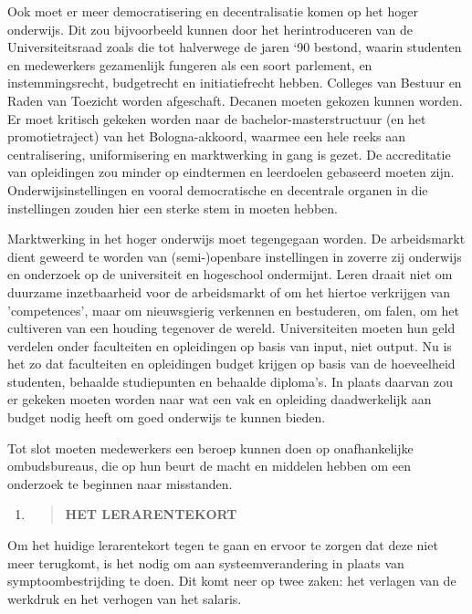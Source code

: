 Ook moet er meer democratisering en decentralisatie komen op het hoger
onderwijs. Dit zou bijvoorbeeld kunnen door het herintroduceren van de
Universiteitsraad zoals die tot halverwege de jaren `90 bestond, waarin
studenten en medewerkers gezamenlijk fungeren als een soort parlement,
en instemmingsrecht, budgetrecht en initiatiefrecht hebben. Colleges van
Bestuur en Raden van Toezicht worden afgeschaft. Decanen moeten gekozen
kunnen worden. Er moet kritisch gekeken worden naar de
bachelor-masterstructuur (en het promotietraject) van het
Bologna-akkoord, waarmee een hele reeks aan centralisering,
uniformisering en marktwerking in gang is gezet. De accreditatie van
opleidingen zou minder op eindtermen en leerdoelen gebaseerd moeten
zijn. Onderwijsinstellingen en vooral democratische en decentrale
organen in die instellingen zouden hier een sterke stem in moeten
hebben.

Marktwerking in het hoger onderwijs moet tegengegaan worden. De
arbeidsmarkt dient geweerd te worden van (semi-)openbare instellingen in
zoverre zij onderwijs en onderzoek op de universiteit en hogeschool
ondermijnt. Leren draait niet om duurzame inzetbaarheid voor de
arbeidsmarkt of om het hiertoe verkrijgen van 'competences', maar om
nieuwsgierig verkennen en bestuderen, om falen, om het cultiveren van
een houding tegenover de wereld. Universiteiten moeten hun geld verdelen
onder faculteiten en opleidingen op basis van input, niet output. Nu is
het zo dat faculteiten en opleidingen budget krijgen op basis van de
hoeveelheid studenten, behaalde studiepunten en behaalde diploma's. In
plaats daarvan zou er gekeken moeten worden naar wat een vak en
opleiding daadwerkelijk aan budget nodig heeft om goed onderwijs te
kunnen bieden.

Tot slot moeten medewerkers een beroep kunnen doen op onafhankelijke
ombudsbureaus, die op hun beurt de macht en middelen hebben om een
onderzoek te beginnen naar misstanden.

\begin{enumerate}
\def\labelenumi{\arabic{enumi}.}
\setcounter{enumi}{10}
\item
  \begin{quote}
  \textbf{HET LERARENTEKORT}
  \end{quote}
\end{enumerate}

Om het huidige lerarentekort tegen te gaan en ervoor te zorgen dat deze
niet meer terugkomt, is het nodig om aan systeemverandering in plaats
van symptoombestrijding te doen. Dit komt neer op twee zaken: het
verlagen van de werkdruk en het verhogen van het salaris.


